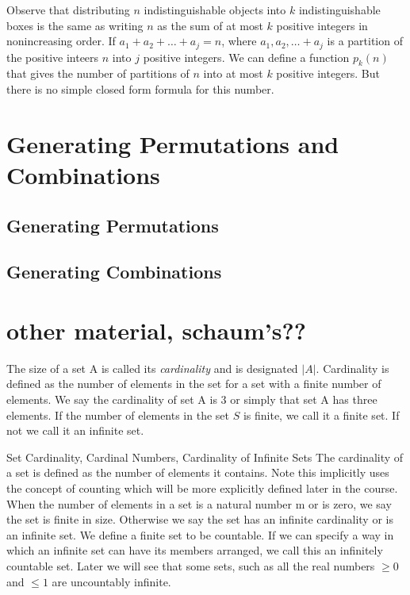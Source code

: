 \documentclass[11pt]{book} %
\theoremstyle {definition}
\theoremstyle {remark}
\begin{document}
Observe that distributing $n$ indistinguishable objects into $k$ indistinguishable boxes is the same as writing $n$ as the sum of at most $k$ positive integers in nonincreasing order. If $a_1+a_2+ \dots +a_j=n$, where $a_1,a_2, \dots +a_j$ is a partition of the positive inteers $n$ into $j$ positive integers. We can define a function $p_k(n)$ that gives the number of partitions of $n$ into at most $k$ positive integers. But there is no simple closed form formula for this number.

\section {Generating Permutations and Combinations}
    \subsection {Generating Permutations}
    \subsection {Generating Combinations}





\section{other material, schaum's??}
The size of a set A is called its \textit{cardinality} and is designated $|A|$. Cardinality is defined as the number of elements in the set for a set with a finite number of elements. We say the cardinality of set A is 3 or simply that set A has three elements. If the number of elements in the set $S$ is finite, we call it a finite set. If not we call it an infinite set.

Set Cardinality, Cardinal Numbers, Cardinality of Infinite Sets
The cardinality of a set is defined as the number of elements it contains. Note this implicitly uses the concept of counting which will be more explicitly defined later in the course. When the number of elements in a set is a natural number m or is zero, we say the set is finite in size. Otherwise we say the set has an infinite cardinality or is an infinite set. We define a finite set to be countable. If we can specify a way in which an infinite set can have its members arranged, we call this an infinitely countable set. Later we will see that some sets, such as all the real numbers $\ge 0$ and $\le 1$ are uncountably infinite. 
\end{document}
